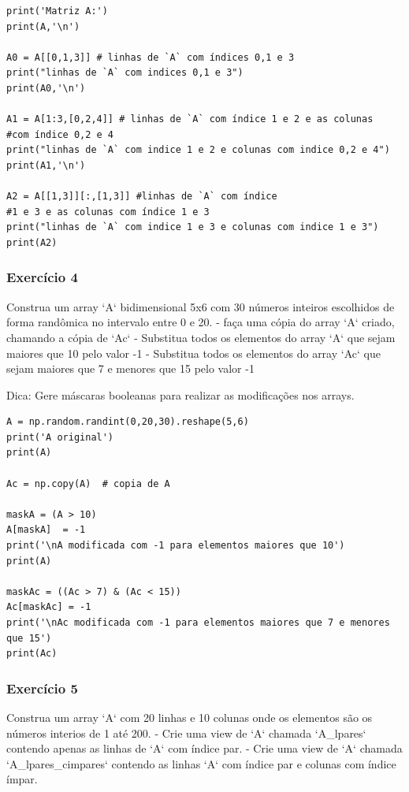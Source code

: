 \documentclass[../numerical_methods.tex]{subfiles}
\begin{document}
\begin{verbatim}
print('Matriz A:')
print(A,'\n')

A0 = A[[0,1,3]] # linhas de `A` com índices 0,1 e 3
print("linhas de `A` com indices 0,1 e 3")
print(A0,'\n')

A1 = A[1:3,[0,2,4]] # linhas de `A` com índice 1 e 2 e as colunas
#com índice 0,2 e 4
print("linhas de `A` com indice 1 e 2 e colunas com indice 0,2 e 4")
print(A1,'\n')

A2 = A[[1,3]][:,[1,3]] #linhas de `A` com índice 
#1 e 3 e as colunas com índice 1 e 3
print("linhas de `A` com indice 1 e 3 e colunas com indice 1 e 3")
print(A2)
\end{verbatim}


\subsubsection{Exercício 4}
Construa um array `A` bidimensional 5x6 com 30 números inteiros escolhidos de forma randômica no intervalo entre 0 e 20.
- faça uma cópia do array `A` criado, chamando a cópia de `Ac`
- Substitua todos os elementos do array `A` que sejam maiores que 10 pelo valor -1
- Substitua todos os elementos do array `Ac` que sejam maiores que 7 e menores que 15 pelo valor -1

Dica: Gere máscaras booleanas para realizar as modificações nos arrays.

\begin{verbatim}
A = np.random.randint(0,20,30).reshape(5,6)
print('A original')
print(A)

Ac = np.copy(A)  # copia de A

maskA = (A > 10)
A[maskA]  = -1
print('\nA modificada com -1 para elementos maiores que 10')
print(A)

maskAc = ((Ac > 7) & (Ac < 15))
Ac[maskAc] = -1
print('\nAc modificada com -1 para elementos maiores que 7 e menores que 15')
print(Ac)
\end{verbatim}


\subsubsection{Exercício 5}
Construa um array `A` com 20 linhas e 10 colunas onde os elementos são os números interios de  1 até 200.
- Crie uma view de `A` chamada `A\_lpares` contendo apenas as linhas de `A` com índice par.
- Crie uma view de `A` chamada `A\_lpares\_cimpares` contendo as linhas `A` com índice par e colunas com índice ímpar.
\end{document}
